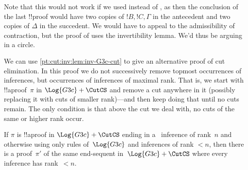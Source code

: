 \documentclass[../../../include/open-logic-section]{subfiles}
\begin{document}
Note that this would not work if we used \Cut{} instead of \CutCS, as
then the conclusion of the last !!{proof} would have two copies of
$!B, !C, \Gamma$ in the antecedent and two copies of $\Delta$ in the
succedent. We would have to appeal to the admissibility of
contraction, but the proof of  uses
the invertibility lemma. We'd thus be arguing in a circle.

We can use \cref{pt:cut:inv:lem:inv-G3c-cut} to give an alternative
proof of cut elimination. In this proof we do not successively remove
topmost occurrences of \CutCS{} inferences, but occurrences of \CutCS{}
inferences of maximal rank. That is, we start with !!a{proof}~$\pi$ in
$\Log{G3c} + \CutCS$ and remove a cut anywhere in it (possibly
replacing it with cuts of smaller rank)---and then keep doing that
until no cuts remain. The only condition is that above the cut we deal
with, no cuts of the same or higher rank occur.

\begin{lem} If $\pi$ is !!a{proof} in
$\Log{G3c}+\CutCS$ ending in a~\CutCS{} inference of rank~$n$ and
otherwise using only rules of~$\Log{G3c}$ and \CutCS{} inferences of
rank $<n$, then there is a proof~$\pi'$ of the same end-sequent
in~$\Log{G3c} + \CutCS$ where every \CutCS{} inference has rank~$<n$.
\end{lem}
\end{document}
